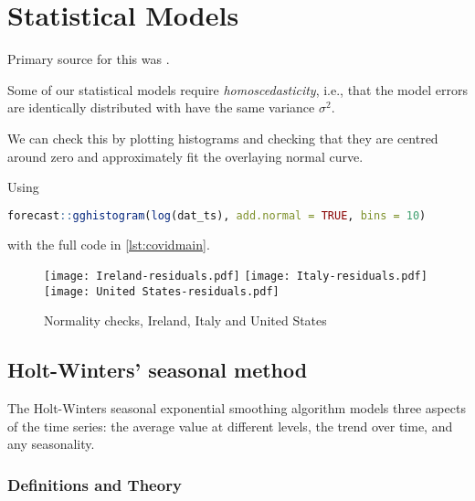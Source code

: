 \section{Statistical Models}
\label{ch:statmodel}

Primary source for this was \citeauthor{Hyndman-et-al-2018} \cite{Hyndman-et-al-2018}.

Some of our statistical models require \textit{homoscedasticity}, i.e., that the model errors are identically distributed with have the same variance $\sigma^2$.

We can check this by plotting histograms and checking that they are centred around zero and approximately fit the overlaying normal curve. 

Using 

\begin{lstlisting}[language = R] 
forecast::gghistogram(log(dat_ts), add.normal = TRUE, bins = 10) 
\end{lstlisting}

with the full code in \ref{lst:covidmain}.

\begin{figure}[H]
  \texttt{[image: Ireland-residuals.pdf]} \label{fig:ireland-residuals}
\endminipage\hfill
{}
  \texttt{[image: Italy-residuals.pdf]} \label{fig:italy-residuals}
\endminipage\hfill
{}
  \texttt{[image: United States-residuals.pdf]} \label{fig:usa-residuals}
\endminipage\hfill
\caption{Normality checks, Ireland, Italy and United States}
\end{figure}

\subsection{Holt-Winters’ seasonal method}

The Holt-Winters seasonal exponential smoothing algorithm models three aspects of the time series: the average value at different levels, the trend over time, and any seasonality.

\subsubsection{Definitions and Theory}

